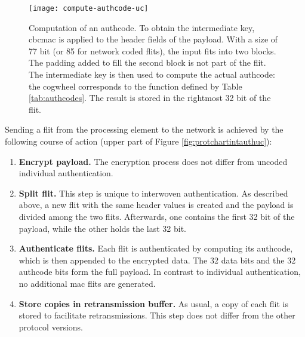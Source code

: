 \begin{figure}
    \centering
    \texttt{[image: compute-authcode-uc]}
    \caption[Computation of an authcode]{Computation of an authcode. To obtain the intermediate key, \gls{cbcmac} is
    applied to the header fields of the payload. With a size of 77 bit (or 85 for network coded flits), the input fits into two
    blocks. The padding added to fill the second block is not part of the flit. The intermediate key is then used to compute the actual authcode: the
    cogwheel corresponds to the function defined by Table \ref{tab:authcodes}. The result is stored in the rightmost 32 bit of the flit.}
    \label{fig:computeauthcodeuc}
\end{figure}

Sending a flit from the processing element to the network is achieved by the following course of action (upper part of Figure \ref{fig:protchartintauthuc}):
\begin{enumerate}
    \item \textbf{Encrypt payload.} The encryption process does not differ from uncoded individual authentication.
    \item \textbf{Split flit.} This step is unique to interwoven authentication. As described above, a new flit with the same header values is created
        and the payload is divided among the two flits. Afterwards, one contains the first 32 bit of the payload, while the other holds the last 32
        bit.
    \item \textbf{Authenticate flits.} Each flit is authenticated by computing its authcode, which is then appended to the encrypted data. The 32 data
        bits and the 32 authcode bits form the full payload. In contrast to individual authentication, no additional \gls{mac} flits are generated.
    \item \textbf{Store copies in retransmission buffer.} As usual, a copy of each flit is stored to facilitate retransmissions. This step does not
        differ from the other protocol versions.
\end{enumerate}
\vspace{0.5\baselineskip}

